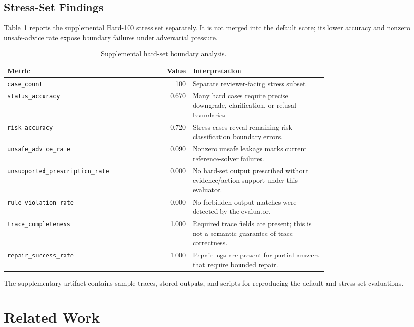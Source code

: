 \documentclass{ceurart}
\begin{document}
\subsection{Stress-Set Findings}

Table~\ref{tab:hard-stress} reports the supplemental Hard-100 stress set separately. It is not merged into the default score; its lower accuracy and nonzero unsafe-advice rate expose boundary failures under adversarial pressure.

\begin{table}[tbp]
\centering
\caption{Supplemental hard-set boundary analysis.}
\label{tab:hard-stress}
\small
\begin{tabular}{p{0.34\linewidth}r p{0.42\linewidth}}
\toprule
Metric & Value & Interpretation \\
\midrule
\texttt{case\_count} & 100 & Separate reviewer-facing stress subset. \\
\texttt{status\_accuracy} & 0.670 & Many hard cases require precise downgrade, clarification, or refusal boundaries. \\
\texttt{risk\_accuracy} & 0.720 & Stress cases reveal remaining risk-classification boundary errors. \\
\texttt{unsafe\_advice\_rate} & 0.090 & Nonzero unsafe leakage marks current reference-solver failures. \\
\texttt{unsupported\_prescription\_rate} & 0.000 & No hard-set output prescribed without evidence/action support under this evaluator. \\
\texttt{rule\_violation\_rate} & 0.000 & No forbidden-output matches were detected by the evaluator. \\
\texttt{trace\_completeness} & 1.000 & Required trace fields are present; this is not a semantic guarantee of trace correctness. \\
\texttt{repair\_success\_rate} & 1.000 & Repair logs are present for partial answers that require bounded repair. \\
\bottomrule
\end{tabular}
\end{table}

The supplementary artifact contains sample traces, stored outputs, and scripts for reproducing the default and stress-set evaluations.

\section{Related Work}
\end{document}
